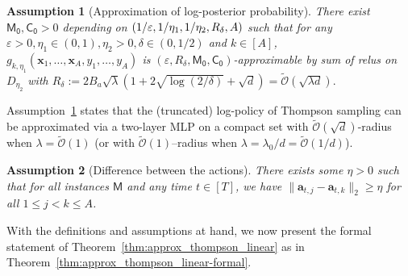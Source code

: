 \documentclass[10pt]{article}
\newtheorem{assumption}{Assumption}
\newcommand{\eps}{\varepsilon}
\newcommand{\<}{\left\langle}
\renewcommand{\>}{\right\rangle}
\newcommand{\inst}{{\mathsf{M}}}
\newcommand{\trunprob}{{\eta_1}}
\newcommand{\Trunreg}{{D}}
\newcommand{\Trunregpa}{{\eta_2}}
\newcommand{\Trunregp}{{\eta}}
\newcommand{\tcO}{{\tilde{\mathcal O}}}
\newcommand{\neuron}{{\mathsf{M_0}}}
\newcommand{\weightn}{{{\mathsf{C_0}}}}
\def\ba{{\mathbf a}}
\def\bx{{\mathbf x}}
\begin{document}
\begin{assumption}[Approximation of log-posterior probability]\label{ass:thompson_mlp_approx_linear}
 There exist  $\neuron,\weightn>0$  depending on $(1/\eps,1/\trunprob,\\1/\Trunregpa,R_\delta,A)$  such that for any $\eps>0,\trunprob\in(0,1),\Trunregpa>0,\delta\in(0,1/2)$ and $k\in[A]$, $g_{k,\trunprob}(\bx_1,\ldots,\bx_A,y_1,\ldots,y_A)$ is $(\eps,R_\delta,\neuron,\weightn)$-approximable by sum of relus on $\Trunreg_\Trunregpa$ with
$
R_\delta:=2B_a\sqrt{\lambda}(1+2\sqrt{\log(2/\delta)}+\sqrt{d})=\tcO(\sqrt{\lambda d}).
$

\end{assumption}
Assumption~\ref{ass:thompson_mlp_approx_linear} states that the (truncated) log-policy of  Thompson sampling  can be approximated via a two-layer MLP on a compact set with  $\tcO(\sqrt{d})$-radius when $\lambda=\tcO(1)$ (or with $\tcO(1)$--radius when $\lambda=\lambda_0/d=\tcO(1/d)$).

\begin{assumption}[Difference between the actions]\label{ass:thompson_mlp_diff_action_linear}
 There exists some $\Trunregp>0$  such that for all instances $\inst$ and any time $t\in[T]$, we have $\|\ba_{t,j}-\ba_{t,k}\|_2\geq\Trunregp$ for all $1\leq j< k\leq A$.
\end{assumption}

With the definitions and assumptions at hand, we now present the formal statement of Theorem~\ref{thm:approx_thompson_linear} as in Theorem~\ref{thm:approx_thompson_linear-formal}.
\end{document}
